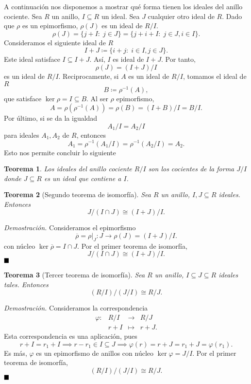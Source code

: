 \documentclass[11pt]{book}
\def\qed{\hfill\blacksquare}
\newtheorem{theorem}{Teorema}[section]
\theoremstyle{definition}
\begin{document}
A continuación nos disponemos a mostrar qué forma tienen los ideales del anillo cociente. Sea $R$ un anillo, $I\subseteq R$ un ideal. Sea $J$ cualquier otro ideal de $R$. Dado que $\rho$ es un epimorfismo, $\rho(J)$ es un ideal de $R/I$.\[
\rho(J)=\{j+I:\; j\in J\}=\{j+i+I:\; j\in J,i\in I\}.
\]Consideramos el siguiente ideal de $R$\[
I+J\coloneq\{i+j:\; i\in I,j\in J\}.
\]Este ideal satisface $I\subseteq I+J$. Así, $I$ es ideal de $I+J$. Por tanto,\[
\rho(J)=(I+J)/I
\]es un ideal de $R/I$. Reciprocamente, si $A$ es un ideal de $R/I$, tomamos el ideal de $R$\[
B\coloneq \rho^{-1}(A),
\]que satisface $\ker\rho =I \subseteq B$. Al ser $\rho$ epimorfismo, \[
A=\rho(\rho^{-1}(A))=\rho(B)=(I+B)/I=B/I.
\]Por último, si se da la igualdad\[
A_1/I=A_2/I
\]para ideales $A_1,A_2$ de $R$, entonces\[
A_1=\rho^{-1}(A_1/I)=\rho^{-1}(A_2/I)=A_2.
\]Esto nos permite concluir lo siguiente
\begin{theorem}
    Los ideales del anillo cociente $R/I$ son los cocientes de la forma $J/I$ donde $J\subseteq R$ es un ideal que contiene a $I$.
\end{theorem}
\begin{theorem}[Segundo teorema de isomorfía]
    Sea $R$ un anillo, $I,J\subseteq R$ ideales. Entonces\[
    J/(I\cap J)\cong (I+J)/I.
    \]
\end{theorem}
\noindent\textit{Demostración.} Consideramos el epimorfismo\[
\overline\rho=\rho|_J:J\longrightarrow \rho(J)=(I+J)/I.
\]con núcleo $\ker\overline\rho = I\cap J$. Por el primer teorema de isomorfía,\[
J/(I\cap J)\cong (I+J)/I.
\]$\qed$
\begin{theorem}[Tercer teorema de isomorfía]
    Sea $R$ un anillo, $I\subseteq J\subseteq R$ ideales tales. Entonces\[
    (R/I)/(J/I)\cong R/J.
    \]
\end{theorem}
\noindent\textit{Demostración.} Consideramos la correspondencia\[
\begin{array}{rlcl}
    \varphi:&R/I&\longrightarrow &R/J\\
    &r+I&\longmapsto &r+J.
\end{array}
\]Esta correspondencia es una aplicación, pues\[
r+ I=r_1+I\implies r-r_1\in I\subseteq J\implies \varphi(r) = r+J=r_1+J = \varphi(r_1).
\]Es más, $\varphi$ es un epimorfismo de anillos con núcleo $\ker\varphi=J/I$. Por el primer teorema de isomorfía,\[
(R/I)/(J/I)\cong R/J.
\]$\qed$
\end{document}
